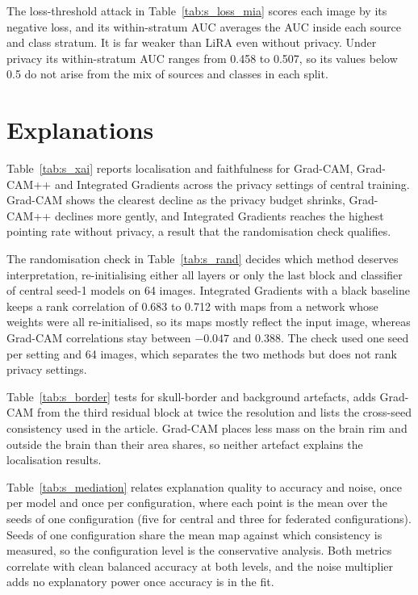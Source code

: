 \documentclass[a4paper,11pt]{article}
\begin{document}


The loss-threshold attack in Table~\ref{tab:s_loss_mia} scores each image by its negative loss, and its within-stratum
AUC averages the AUC inside each source and class stratum. It is far weaker than LiRA even without privacy. Under privacy its
within-stratum AUC ranges from 0.458 to 0.507, so its values below 0.5 do not arise from the mix of sources and classes
in each split.



\section{Explanations}
Table~\ref{tab:s_xai} reports localisation and faithfulness for Grad-CAM, Grad-CAM++ and Integrated Gradients across the
privacy settings of central training. Grad-CAM shows the clearest decline as the privacy budget shrinks, Grad-CAM++
declines more gently, and Integrated Gradients reaches the highest pointing rate without privacy, a result that the
randomisation check qualifies.



The randomisation check in Table~\ref{tab:s_rand} decides which method deserves interpretation, re-initialising
either all layers or only the last block and classifier of central seed-1 models on 64 images. Integrated Gradients
with a black baseline keeps a rank correlation of 0.683 to 0.712 with maps from a network whose weights were all
re-initialised, so its maps mostly reflect the input image, whereas Grad-CAM correlations stay between $-0.047$ and
0.388. The check used one seed per setting and 64 images, which separates the two methods but does not rank privacy
settings.



Table~\ref{tab:s_border} tests for skull-border and background artefacts, adds Grad-CAM from the third residual block
at twice the resolution and lists the cross-seed consistency used in the article. Grad-CAM places less mass on the
brain rim and outside the brain than their area shares, so neither artefact explains the localisation results.



Table~\ref{tab:s_mediation} relates explanation quality to accuracy and noise, once per model and once per
configuration, where each point is the mean over the seeds of one configuration (five for central and three for
federated configurations). Seeds of one configuration share the mean map against which consistency is measured, so
the configuration level is the conservative analysis. Both metrics correlate with clean balanced accuracy at both
levels, and the noise multiplier adds no explanatory power once accuracy is in the fit.
\end{document}
